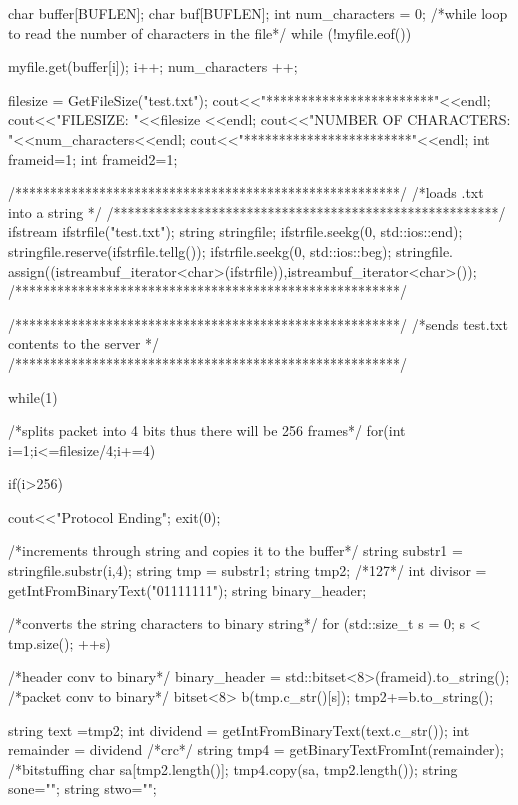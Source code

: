 \documentclass{article}
\begin{document}
\begin{titlepage}
{	
	char buffer[BUFLEN];
	char buf[BUFLEN];
	int num_characters = 0;
	/*while loop to read the number of characters in the file*/
	while (!myfile.eof())
      	{
      	
      		
            myfile.get(buffer[i]);
            i++;
            num_characters ++;
            
      	}  
      	
      	
	filesize  = GetFileSize("test.txt");
      	cout<<"************************"<<endl;
      	cout<<"FILESIZE: "<<filesize <<endl;
      	cout<<"NUMBER OF CHARACTERS: "<<num_characters<<endl;
      	cout<<"************************"<<endl;
      	int frameid=1;
      	int frameid2=1;
      	
      	
        /*******************************************************/
		/*loads .txt into a string */
	/*******************************************************/
      	ifstream ifstrfile("test.txt");
      	string stringfile;
      	ifstrfile.seekg(0, std::ios::end);
      	stringfile.reserve(ifstrfile.tellg());
      	ifstrfile.seekg(0, std::ios::beg);
      	stringfile. assign((istreambuf_iterator<char>(ifstrfile)),istreambuf_iterator<char>());
      	/*******************************************************/
      	
       /*******************************************************/
		/*sends test.txt contents to the server */
	/*******************************************************/
		
	while(1)
	{	
	
		/*splits packet into 4 bits
		thus there will be 256 frames*/
		for(int i=1;i<=filesize/4;i+=4)
		{
			if(i>256)
			{
				cout<<"Protocol Ending";
				exit(0);
			
			}
			
			/*increments through string 
			and copies it to the buffer*/	
			string substr1 = stringfile.substr(i,4);
			string tmp = substr1;
			string tmp2;
			/*127*/
			int divisor = getIntFromBinaryText("01111111");
			string binary_header; 
		
			/*converts the string characters to binary string*/
   			for (std::size_t s = 0; s < tmp.size(); ++s)
  			{
  				/*header conv to binary*/
  				binary_header = std::bitset<8>(frameid).to_string(); 
  				/*packet conv to binary*/
      			 	bitset<8> b(tmp.c_str()[s]);
      			 	tmp2+=b.to_string();
      			 	
  			}
  			
  			
  			string text =tmp2;
  			int dividend = getIntFromBinaryText(text.c_str());
  			int remainder = dividend %
  			/*crc*/
  			string tmp4 = getBinaryTextFromInt(remainder);
  			/*bitstuffing 
  			char sa[tmp2.length()];
  			tmp4.copy(sa, tmp2.length());
  			string sone="";
  			string stwo="";
  			
}}}
\end{titlepage}
\end{document}
